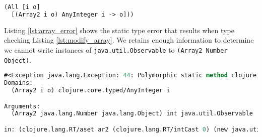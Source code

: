 \documentclass[preprint]{sigplanconf}
\begin{document}
\begin{lstlisting}[language=Lisp, label=lst:aset_ann, caption=Type for aset]
(All [i o]
  [(Array2 i o) AnyInteger i -> o]))
\end{lstlisting}

Listing \ref{lst:array_error} shows the static type error that results when type checking Listing \ref{lst:modify_array}.
We retains enough information to determine we cannot write instances of
\lstinline|java.util.Observable| to \lstinline|(Array2 Number Object)|.

\begin{lstlisting}[language=lisp, label=lst:array_error, caption=Static type error for ill-typed array set]
#<Exception java.lang.Exception: 44: Polymorphic static method clojure.lang.RT/aset could not be applied to arguments:
Domains: 
  (Array2 i o) clojure.core.typed/AnyInteger i

Arguments:
  (Array2 java.lang.Number java.lang.Object) int java.util.Observable

in: (clojure.lang.RT/aset ar2 (clojure.lang.RT/intCast 0) (new java.util.Observable))>
\end{lstlisting}


%
%
%


%
%
%
%
%
\end{document}
